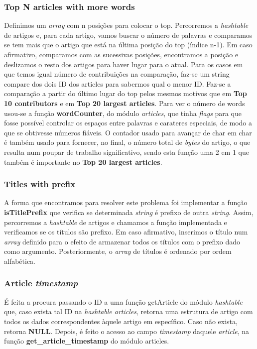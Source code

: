 \documentclass[a4paper]{article}
\begin{document}
\subsubsection{Top N articles with more words}
Definimos um \textit{array} com n posições para colocar o top. Percorremos a \textit{hashtable} de artigos e, para cada artigo, vamos buscar o número de palavras e comparamos se tem mais que o artigo que está na última posição do top (índice n-1). Em caso afirmativo, comparamos com as sucessivas posições, encontramos a posição e deslizamos o resto dos artigos para haver lugar para o atual. Para os casos em que temos igual número de contribuições na comparação, faz-se um string compare dos dois ID dos articles para sabermos qual o menor ID.
Faz-se a comparação a partir do último lugar do top pelos mesmos motivos que em \textbf{Top 10 contributors} e em \textbf{Top 20 largest articles}.
Para ver o número de words usou-se a função \textbf{wordCounter}, do módulo \textit{articles}, que tinha \textit{flags} para que fosse possível controlar os espaços entre palavras e carateres especiais, de modo a que se obtivesse números fiáveis. O contador usado para avançar de char em char é também usado para fornecer, no final, o número total de \textit{bytes} do artigo, o que resulta num poupar de trabalho significativo, sendo esta função uma 2 em 1 que também é importante no \textbf{Top 20 largest articles}.

\subsubsection{Titles with prefix}
A forma que encontramos para resolver este problema foi implementar a função \textbf{isTitlePrefix} que verifica se determinada \textit{string} é prefixo de outra \textit{string}. Assim, percorremos a \textit{hashtable} de artigos e chamamos a função implementada e verificamos se os títulos são prefixo. Em caso afirmativo, inserimos o título num \textit{array} definido para o efeito de armazenar todos os títulos com o prefixo dado como argumento. Posteriormente, o \textit{array} de títulos é ordenado por ordem alfabética.

\subsubsection{Article \textit{timestamp}}
É feita a procura passando o ID a uma função getArticle do módulo \textit{hashtable} que, caso exista tal ID na \textit{hashtable articles}, retorna uma estrutura de artigo com todos os dados correspondentes àquele artigo em específico. Caso não exista, retorna \textbf{NULL}. Depois, é feito o acesso ao campo \textit{timestamp} daquele \textit{article}, na função \textbf{get_article_timestamp} do módulo articles.
\end{document}
